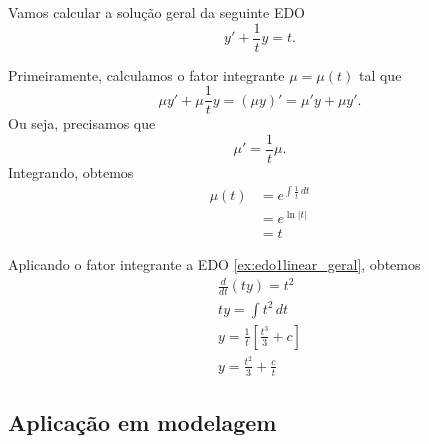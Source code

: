 \begin{ex}
  Vamos calcular a solução geral da seguinte EDO
  \begin{equation}\label{ex:edo1linear_geral}
    y' + \frac{1}{t}y = t.
  \end{equation}

  Primeiramente, calculamos o fator integrante $\mu = \mu(t)$ tal que
  \begin{equation}
    \mu y' + \mu \frac{1}{t} y = (\mu y)' = \mu'y + \mu y'.
  \end{equation}
  Ou seja, precisamos que
  \begin{equation}
    \mu' = \frac{1}{t}\mu.
  \end{equation}
  Integrando, obtemos
  \begin{align}
    \mu(t) &= e^{\int \frac{1}{t}\,dt} \\
           &= e^{\ln|t|} \\
           &= t
  \end{align}

  Aplicando o fator integrante a EDO \eqref{ex:edo1linear_geral}, obtemos
  \begin{gather}
    \frac{d}{dt}\left(t y\right) = t^2 \\
    ty = \int t^2\,dt \\
    y = \frac{1}{t}\left[\frac{t^3}{3} + c\right] \\
    y = \frac{t^2}{3} + \frac{c}{t}
  \end{gather}
\end{ex}

\subsection{Aplicação em modelagem}


